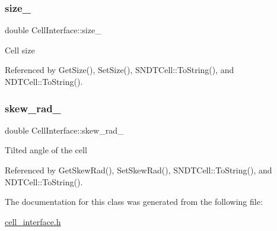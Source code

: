 \subsubsection{\texorpdfstring{size\+\_\+}{size\_}}
{\footnotesize\ttfamily double Cell\+Interface\+::size\+\_\+\hspace{0.3cm}{\ttfamily [protected]}}

Cell size 

Referenced by Get\+Size(), Set\+Size(), S\+N\+D\+T\+Cell\+::\+To\+String(), and N\+D\+T\+Cell\+::\+To\+String().

\mbox{\label{classCellInterface_a5de34cbe7e4988e4f46560ee234f6e8c}} 
\subsubsection{\texorpdfstring{skew\+\_\+rad\+\_\+}{skew\_rad\_}}
{\footnotesize\ttfamily double Cell\+Interface\+::skew\+\_\+rad\+\_\+\hspace{0.3cm}{\ttfamily [protected]}}

Tilted angle of the cell 

Referenced by Get\+Skew\+Rad(), Set\+Skew\+Rad(), S\+N\+D\+T\+Cell\+::\+To\+String(), and N\+D\+T\+Cell\+::\+To\+String().



The documentation for this class was generated from the following file\+:\begin{DoxyCompactItemize}
\item 
\hyperlink{cell__interface_8h}{cell\+\_\+interface.\+h}\end{DoxyCompactItemize}
